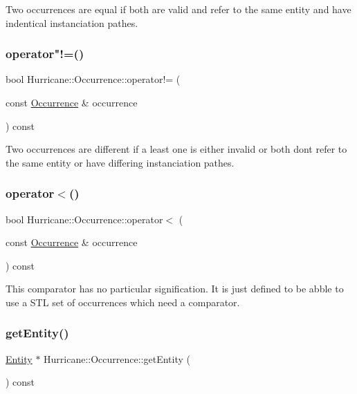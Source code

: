 Two occurrences are equal if both are valid and refer to the same entity and have indentical instanciation pathes. \mbox{\label{classHurricane_1_1Occurrence_a39edad19edeef964e5340381360c0add}} 
\subsubsection{\texorpdfstring{operator"!=()}{operator!=()}}
{\footnotesize\ttfamily bool Hurricane\+::\+Occurrence\+::operator!= (\begin{DoxyParamCaption}\item[{const \hyperlink{classHurricane_1_1Occurrence}{Occurrence} \&}]{occurrence }\end{DoxyParamCaption}) const}

Two occurrences are different if a least one is either invalid or both don\textquotesingle{}t refer to the same entity or have differing instanciation pathes. \mbox{\label{classHurricane_1_1Occurrence_a2f1668ccce22799c99eb3a02e522c204}} 
\subsubsection{\texorpdfstring{operator$<$()}{operator<()}}
{\footnotesize\ttfamily bool Hurricane\+::\+Occurrence\+::operator$<$ (\begin{DoxyParamCaption}\item[{const \hyperlink{classHurricane_1_1Occurrence}{Occurrence} \&}]{occurrence }\end{DoxyParamCaption}) const}

This comparator has no particular signification. It is just defined to be abble to use a S\+TL set of occurrences which need a comparator. \mbox{\label{classHurricane_1_1Occurrence_ac121005d5d3bc0837f66c0de4265b0c4}} 
\subsubsection{\texorpdfstring{get\+Entity()}{getEntity()}}
{\footnotesize\ttfamily \hyperlink{classHurricane_1_1Entity}{Entity} $\ast$ Hurricane\+::\+Occurrence\+::get\+Entity (\begin{DoxyParamCaption}{ }\end{DoxyParamCaption}) const\hspace{0.3cm}{\ttfamily [inline]}}

